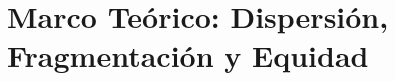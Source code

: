 
\section{Marco Teórico: Dispersión, Fragmentación y Equidad}
\label{sec:marco-teorico-dispersion}



